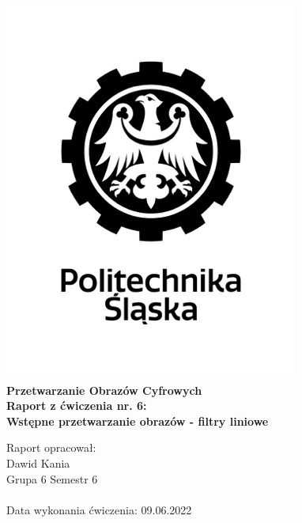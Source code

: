 
\begin{titlepage}
    \begin{center}
        \includegraphics[width=.50\linewidth]{other/polsl.png}\\
        \Huge
        \textbf{Przetwarzanie Obrazów Cyfrowych}
        \\ \vspace{1.5cm}
        \Large
        \textbf{Raport z ćwiczenia nr. 6: } \\
        \textbf{Wstępne przetwarzanie obrazów - filtry liniowe}        
    \end{center}
    \vspace{3.0cm}
    \Large
    Raport opracował: \\
    Dawid Kania \\
    Grupa 6 Semestr 6 \\ \\
    Data wykonania ćwiczenia: 09.06.2022
\end{titlepage}
